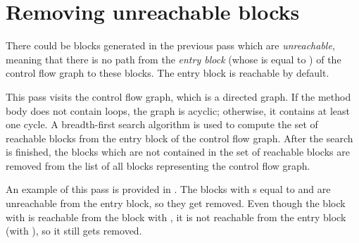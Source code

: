 \section{Removing unreachable blocks}

There could be blocks generated in the previous pass which are \textit{unreachable}, meaning that there is no path from
the \textit{entry block} (whose  is equal to ) of the control flow graph to these blocks. The entry
block is reachable by default.

This pass visits the control flow graph, which is a directed graph. If the method body does not contain loops, the graph
is acyclic; otherwise, it contains at least one cycle. A breadth-first search algorithm is used to compute the set of
reachable blocks from the entry block of the control flow graph. After the search is finished, the blocks which are not
contained in the set of reachable blocks are removed from the list of all blocks representing the control flow graph.

An example of this pass is provided in . The blocks with s equal
to  and  are unreachable from the entry block, so they get removed. Even though the block with 
 is reachable from the block with  , it is not reachable from the entry block (with 
), so it still gets removed.

